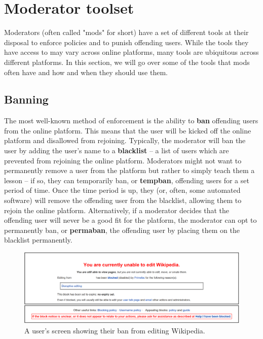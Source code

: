 \documentclass[class=book, crop=false]{standalone}
\providecommand{\keyterm}[1]{\textbf{#1}\marginnote{\scriptsize \textbf{#1}}}
\begin{document}
\section{Moderator toolset}

Moderators (often called "mods" for short) have a set of different tools at their disposal to enforce policies and to punish offending users. While the tools they have access to may vary across online platforms, many tools are ubiquitous across different platforms. In this section, we will go over some of the tools that mods often have and how and when they should use them.

\subsection{Banning}

The most well-known method of enforcement is the ability to \keyterm{ban} offending users from the online platform. This means that the user will be kicked off the online platform and disallowed from rejoining. Typically, the moderator will ban the user by adding the user's name to a \keyterm{blacklist} -- a list of users which are prevented from rejoining the online platform. Moderators might not want to permanently remove a user from the platform but rather to simply teach them a lesson -- if so, they can temporarily ban, or \keyterm{tempban}, offending users for a set period of time. Once the time period is up, they (or, often, some automated software) will remove the offending user from the blacklist, allowing them to rejoin the online platform. Alternatively, if a moderator decides that the offending user will never be a good fit for the platform, the moderator can opt to permanently ban, or \keyterm{permaban}, the offending user by placing them on the blacklist permanently.

\begin{figure}[!tbp]
  \centering
  \begin{minipage}[b]{0.8\textwidth}
    \includegraphics[width=\textwidth]{Blocknotice-wikipedia}
    \caption{A user's screen showing their ban from editing Wikipedia.}
  \end{minipage}
\end{figure}
\end{document}
